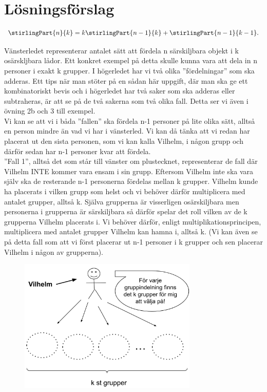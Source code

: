 \documentclass[nobib]{tufte-handout}
\begin{document}
\section{Lösningsförslag}
\begin{xca2}
  $$\stirlingPart{n}{k} = k\stirlingPart{n-1}{k} + \stirlingPart{n-1}{k-1}.$$

  Vänsterledet representerar antalet sätt att fördela n särskiljbara objekt i k osärskljbara lådor. Ett konkret exempel på detta skulle kunna vara att dela in n personer i exakt k grupper. I högerledet har vi två olika ”fördelningar” som ska adderas. Ett tips när man stöter på en sådan här uppgift, där man ska ge ett kombinatoriskt bevis och i högerledet har två saker som ska adderas eller subtraheras, är att se på de två sakerna som två olika fall. Detta ser vi även i övning 2b och 3 till exempel.\\
Vi kan se att vi i båda ”fallen” ska fördela n-1 personer på lite olika sätt, alltså en person mindre än vad vi har i vänsterled. Vi kan då tänka att vi redan har placerat ut den sista personen, som vi kan kalla Vilhelm, i någon grupp och därför sedan har n-1 personer kvar att fördela.\\
”Fall 1”, alltså det som står till vänster om plustecknet, representerar de fall där Vilhelm INTE kommer vara ensam i sin grupp. Eftersom Vilhelm inte ska vara själv ska de resterande n-1 personerna fördelas mellan k grupper. Vilhelm kunde ha placerats i vilken grupp som helst och vi behöver därför multiplicera med antalet grupper, alltså k. Själva grupperna är visserligen osärskiljbara men personerna i grupperna är särskiljbara så därför spelar det roll vilken av de k grupperna Vilhelm placerats i. Vi behöver därför, enligt multiplikationsprincipen, multiplicera med antalet grupper Vilhelm kan hamna i, alltså k.  (Vi kan även se på detta fall som att vi först placerar ut n-1 personer i k grupper och sen placerar Vilhelm i någon av grupperna).

   \begin{figure}[h]
\includegraphics[width=85mm]{ovning_1.1.png}
\end{figure}


\end{xca2}
\end{document}
